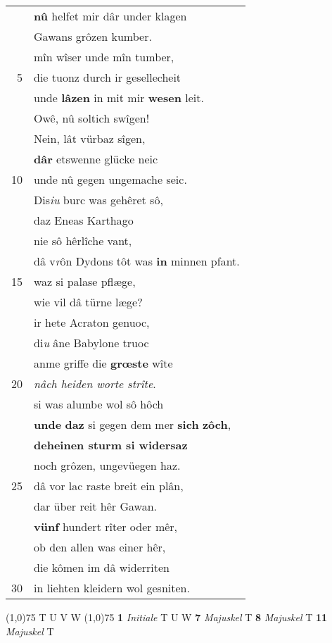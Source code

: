 \documentclass[8pt,a4paper,notitlepage]{article}
\begin{document}
\begin{table}[ht]
\begin{minipage}[t]{0.5\linewidth}
\begin{tabular}{rl}
 & \textbf{nû} helfet mir dâr under klagen\\ 
 & Gawans grôzen kumber.\\ 
 & mîn wîser unde mîn tumber,\\ 
5 & die tuonz durch ir gesellecheit\\ 
 & unde \textbf{lâzen} in mit mir \textbf{wesen} leit.\\ 
 & Owê, nû soltich swîgen!\\ 
 & Nein, lât vürbaz sîgen,\\ 
 & \textbf{dâr} etswenne glücke neic\\ 
10 & unde nû gegen ungemache seic.\\ 
 & Dis\textit{iu} burc was gehêret sô,\\ 
 & daz Eneas Karthago\\ 
 & nie sô hêrlîche vant,\\ 
 & dâ v\textit{r}ôn Dydons tôt was \textbf{in} minnen pfant.\\ 
15 & waz si palase pflæge,\\ 
 & wie vil dâ türne læge?\\ 
 & ir hete Acraton genuoc,\\ 
 & di\textit{u} âne Babylone truoc\\ 
 & anme griffe die \textbf{grœste} wîte\\ 
20 & \textit{nâch heiden worte strîte}.\\ 
 & si was alumbe wol sô hôch\\ 
 & \textbf{unde} \textbf{daz} si gegen dem mer \textbf{sich} \textbf{zôch},\\ 
 & \textbf{deheinen sturm si widersaz}\\ 
 & noch grôzen, ungevüegen haz.\\ 
25 & dâ vor lac raste breit ein plân,\\ 
 & dar über reit hêr Gawan.\\ 
 & \textbf{vünf} hundert rîter oder mêr,\\ 
 & ob den allen was einer hêr,\\ 
 & die kômen im dâ widerriten\\ 
30 & in liehten kleidern wol gesniten.\\ 
\end{tabular}
\scriptsize
\line(1,0){75} \newline
T U V W \newline
\line(1,0){75} \newline
\textbf{1} \textit{Initiale} T U W  \textbf{7} \textit{Majuskel} T  \textbf{8} \textit{Majuskel} T  \textbf{11} \textit{Majuskel} T  \newline

\end{minipage}
\end{table}
\end{document}
